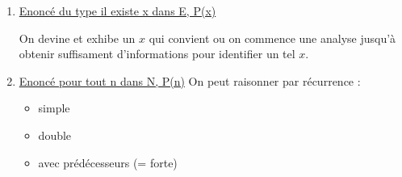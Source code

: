 \begin{enumerate}
\item\ul{Enoncé du type il existe x dans E, P(x)}

On devine et exhibe un $x$ qui convient ou on commence une analyse jusqu'à obtenir
suffisament d'informations pour identifier un tel $x$. \\

\item\ul{Enoncé pour tout n dans N, P(n)}
On peut raisonner par récurrence : 
\begin{itemize}
    \item simple
    \item double
    \item avec prédécesseurs (= forte)
\end{itemize}
\end{enumerate}
